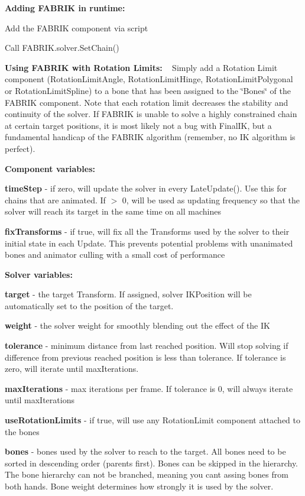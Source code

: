 {\bfseries Adding F\+A\+B\+R\+IK in runtime\+:}
\begin{DoxyItemize}
\item Add the F\+A\+B\+R\+IK component via script
\item Call F\+A\+B\+R\+I\+K.\+solver.\+Set\+Chain()
\end{DoxyItemize}

{\bfseries Using F\+A\+B\+R\+IK with Rotation Limits\+:} ~\newline
Simply add a Rotation Limit component (Rotation\+Limit\+Angle, Rotation\+Limit\+Hinge, Rotation\+Limit\+Polygonal or Rotation\+Limit\+Spline) to a bone that has been assigned to the \char`\"{}\+Bones\char`\"{} of the F\+A\+B\+R\+IK component. Note that each rotation limit decreases the stability and continuity of the solver. If F\+A\+B\+R\+IK is unable to solve a highly constrained chain at certain target positions, it is most likely not a bug with Final\+IK, but a fundamental handicap of the F\+A\+B\+R\+IK algorithm (remember, no IK algorithm is perfect).



{\bfseries Component variables\+:}
\begin{DoxyItemize}
\item {\bfseries time\+Step} -\/ if zero, will update the solver in every Late\+Update(). Use this for chains that are animated. If $>$ 0, will be used as updating frequency so that the solver will reach its target in the same time on all machines
\item {\bfseries fix\+Transforms} -\/ if true, will fix all the Transforms used by the solver to their initial state in each Update. This prevents potential problems with unanimated bones and animator culling with a small cost of performance
\end{DoxyItemize}

{\bfseries Solver variables\+:}
\begin{DoxyItemize}
\item {\bfseries target} -\/ the target Transform. If assigned, solver I\+K\+Position will be automatically set to the position of the target.
\item {\bfseries weight} -\/ the solver weight for smoothly blending out the effect of the IK
\item {\bfseries tolerance} -\/ minimum distance from last reached position. Will stop solving if difference from previous reached position is less than tolerance. If tolerance is zero, will iterate until max\+Iterations.
\item {\bfseries max\+Iterations} -\/ max iterations per frame. If tolerance is 0, will always iterate until max\+Iterations
\item {\bfseries use\+Rotation\+Limits} -\/ if true, will use any Rotation\+Limit component attached to the bones
\item {\bfseries bones} -\/ bones used by the solver to reach to the target. All bones need to be sorted in descending order (parents first). Bones can be skipped in the hierarchy. The bone hierarchy can not be branched, meaning you cant assing bones from both hands. Bone weight determines how strongly it is used by the solver.
\end{DoxyItemize}

 